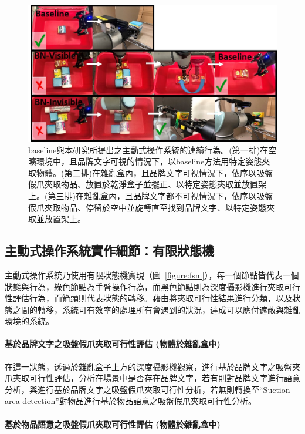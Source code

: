 \begin{figure}[ht]
	\centering
	\includegraphics[height=!, width=1.0\linewidth, keepaspectratio=true]
	{./figures/active_manipulation_and_baseline.jpg}
  \caption{baseline與本研究所提出之主動式操作系統的連續行為。(第一排)在空曠環境中，且品牌文字可視的情況下，以baseline方法用特定姿態夾取物體。(第二排)在雜亂盒內，且品牌文字可視情況下，依序以吸盤假爪夾取物品、放置於乾淨盒子並擺正、以特定姿態夾取並放置架上。(第三排)在雜亂盒內，且品牌文字都不可視情況下，依序以吸盤假爪夾取物品、停留於空中並旋轉直至找到品牌文字、以特定姿態夾取並放置架上。
	}
  \label{figure:active_manipulation_and_baseline}
\end{figure}

\subsection{主動式操作系統實作細節：有限狀態機}

主動式操作系統乃使用有限狀態機實現（圖~\ref{figure:fsm}），每一個節點皆代表一個狀態與行為，綠色節點為手臂操作行為，而黑色節點則為深度攝影機進行夾取可行性評估行為，而箭頭則代表狀態的轉移。藉由將夾取可行性結果進行分類，以及狀態之間的轉移，系統可有效率的處理所有會遇到的狀況，達成可以應付遮蔽與雜亂環境的系統。

\paragraph{基於品牌文字之吸盤假爪夾取可行性評估 (物體於雜亂盒中)}
在這一狀態，透過於雜亂盒子上方的深度攝影機觀察，進行基於品牌文字之吸盤夾爪夾取可行性評估，分析在場景中是否存在品牌文字，若有則對品牌文字進行語意分析，與進行基於品牌文字之吸盤假爪夾取可行性分析，若無則轉換至``Suction area detection''對物品進行基於物品語意之吸盤假爪夾取可行性分析。

\paragraph{基於物品語意之吸盤假爪夾取可行性評估 (物體於雜亂盒中)}

